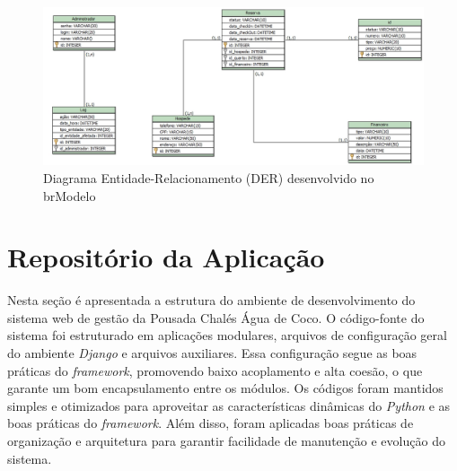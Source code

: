 \documentclass[
	12pt,				%
	openany,			%
	oneside,			%
	a4paper,			%
	english,			%
	french,				%
	spanish,			%
	brazil				%
	]{abntex2}
\begin{document}
\begin{figure}[H]
	\centering
	\includegraphics[width=\textwidth]{0406-DER.jpg}
	\caption{Diagrama Entidade-Relacionamento (DER) desenvolvido no brModelo}
	\label{fig:der}
\end{figure}

\section{Repositório da Aplicação}Nesta seção é apresentada a estrutura do ambiente de desenvolvimento do sistema web de gestão da Pousada Chalés Água de Coco. O código-fonte do sistema foi estruturado em aplicações modulares, arquivos de configuração geral do ambiente \textit{Django} e arquivos auxiliares. Essa configuração segue as boas práticas do \textit{framework}, promovendo baixo acoplamento e alta coesão, o que garante um bom encapsulamento entre os módulos. Os códigos foram mantidos simples e otimizados para aproveitar as características dinâmicas do \textit{Python} e as boas práticas do \textit{framework}. Além disso, foram aplicadas boas práticas de organização e arquitetura para garantir facilidade de manutenção e evolução do sistema.
\end{document}
